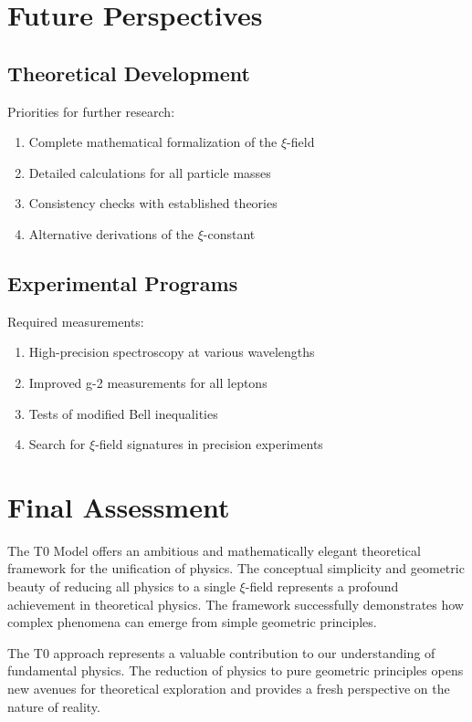\documentclass[12pt,a4paper]{report}
\begin{document}
	\section{Future Perspectives}
	
	\subsection{Theoretical Development}
	
	Priorities for further research:
	
	\begin{enumerate}
		\item Complete mathematical formalization of the $\xi$-field
		\item Detailed calculations for all particle masses
		\item Consistency checks with established theories
		\item Alternative derivations of the $\xi$-constant
	\end{enumerate}
	
	\subsection{Experimental Programs}
	
	Required measurements:
	
	\begin{enumerate}
		\item High-precision spectroscopy at various wavelengths
		\item Improved g-2 measurements for all leptons
		\item Tests of modified Bell inequalities
		\item Search for $\xi$-field signatures in precision experiments
	\end{enumerate}
	
	\section{Final Assessment}
	
	The T0 Model offers an ambitious and mathematically elegant theoretical framework for the unification of physics. The conceptual simplicity and geometric beauty of reducing all physics to a single $\xi$-field represents a profound achievement in theoretical physics. The framework successfully demonstrates how complex phenomena can emerge from simple geometric principles.
	
	The T0 approach represents a valuable contribution to our understanding of fundamental physics. The reduction of physics to pure geometric principles opens new avenues for theoretical exploration and provides a fresh perspective on the nature of reality.
	
\end{document}
